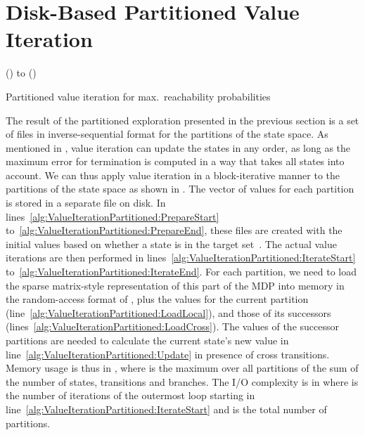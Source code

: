 \documentclass{llncs}
\begin{document}
\section{Disk-Based Partitioned Value Iteration}
\label{sec:PartitionedVI}

\begin{algorithm}[t]
\For(){ to \label{alg:ValueIterationPartitioned:PrepareStart}}{
  \;
  \label{alg:ValueIterationPartitioned:PrepareEnd}\;
}
\While(\label{alg:ValueIterationPartitioned:IterateStart}){}{
}
\Return{}
\caption{\small Partitioned value iteration for max.\ reachability probabilities}
\label{alg:ValueIterationPartitioned}
\end{algorithm}

The result of the partitioned exploration presented in the previous section is a set of files in inverse-sequential format for the partitions of the state space.
As mentioned in , value iteration can update the states in any order, as long as the maximum error for termination is computed in a way that takes all states into account.
We can thus apply value iteration in a block-iterative manner to the partitions of the state space as shown in .
The vector of values for each partition is stored in a separate file on disk.
In lines~\ref{alg:ValueIterationPartitioned:PrepareStart} to~\ref{alg:ValueIterationPartitioned:PrepareEnd}, these files are created with the initial values based on whether a state is in the target set~.
The actual value iterations are then performed in lines~\ref{alg:ValueIterationPartitioned:IterateStart} to~\ref{alg:ValueIterationPartitioned:IterateEnd}.
For each partition, we need to load the sparse matrix-style representation of this part of the MDP into memory in the random-access format of , plus the values for the current partition (line~\ref{alg:ValueIterationPartitioned:LoadLocal}), and those of its successors (lines~\ref{alg:ValueIterationPartitioned:LoadCross}).
The values of the successor partitions are needed to calculate the current state's new value in line~\ref{alg:ValueIterationPartitioned:Update} in presence of cross transitions.
Memory usage is thus in , where  is the maximum over all partitions of the sum of the number of states, transitions and branches.
The I/O complexity is in  where  is the number of iterations of the outermost loop starting in line~\ref{alg:ValueIterationPartitioned:IterateStart} and  is the total number of partitions.
\end{document}
